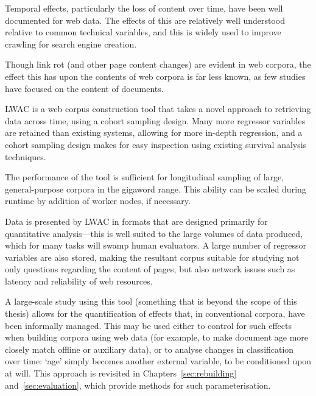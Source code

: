 

Temporal effects, particularly the loss of content over time, have been well documented for web data.  The effects of this are relatively well understood relative to common technical variables, and this is widely used to improve crawling for search engine creation.

Though link rot (and other page content changes) are evident in web corpora, the effect this has upon the contents of web corpora is far less known, as few studies have focused on the content of documents.

LWAC is a web corpus construction tool that takes a novel approach to retrieving data across time, using a cohort sampling design.  Many more regressor variables are retained than existing systems, allowing for more in-depth regression, and a cohort sampling design makes for easy inspection using existing survival analysis techniques.

The performance of the tool is sufficient for longitudinal sampling of large, general-purpose corpora in the gigaword range.  This ability can be scaled during runtime by addition of worker nodes, if necessary.

Data is presented by LWAC in formats that are designed primarily for quantitative analysis---this is well suited to the large volumes of data produced, which for many tasks will swamp human evaluators.  A large number of regressor variables are also stored, making the resultant corpus suitable for studying not only questions regarding the content of pages, but also network issues such as latency and reliability of web resources.

A large-scale study using this tool (something that is beyond the scope of this thesis) allows for the quantification of effects that, in conventional corpora, have been informally managed.  This may be used either to control for such effects when building corpora using web data (for example, to make document age more closely match offline or auxiliary data), or to analyse changes in classification over time: `age' simply becomes another external variable, to be conditioned upon at will.  This approach is revisited in Chapters~\ref{sec:rebuilding} and~\ref{sec:evaluation}, which provide methods for such parameterisation.









